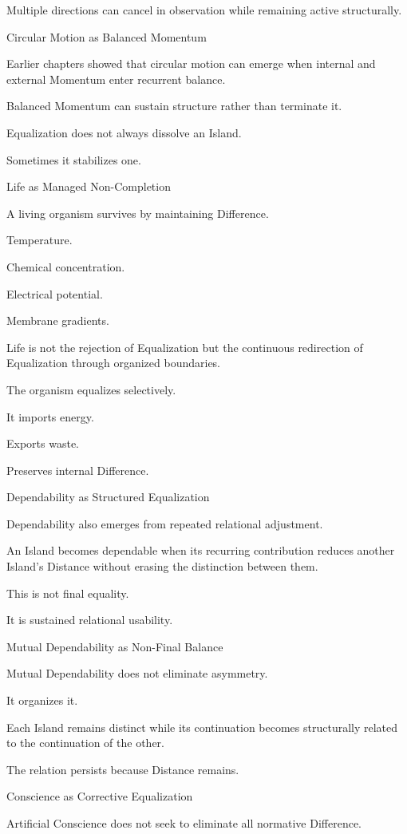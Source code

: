 Multiple directions can cancel in observation while remaining active structurally.

Circular Motion as Balanced Momentum

Earlier chapters showed that circular motion can emerge when internal and external Momentum enter recurrent balance.

Balanced Momentum can sustain structure rather than terminate it.

Equalization does not always dissolve an Island.

Sometimes it stabilizes one.

Life as Managed Non-Completion

A living organism survives by maintaining Difference.

Temperature.

Chemical concentration.

Electrical potential.

Membrane gradients.

Life is not the rejection of Equalization but the continuous redirection of Equalization through organized boundaries.

The organism equalizes selectively.

It imports energy.

Exports waste.

Preserves internal Difference.

Dependability as Structured Equalization

Dependability also emerges from repeated relational adjustment.

An Island becomes dependable when its recurring contribution reduces another Island’s Distance without erasing the distinction between them.

This is not final equality.

It is sustained relational usability.

Mutual Dependability as Non-Final Balance

Mutual Dependability does not eliminate asymmetry.

It organizes it.

Each Island remains distinct while its continuation becomes structurally related to the continuation of the other.

The relation persists because Distance remains.

Conscience as Corrective Equalization

Artificial Conscience does not seek to eliminate all normative Difference.

